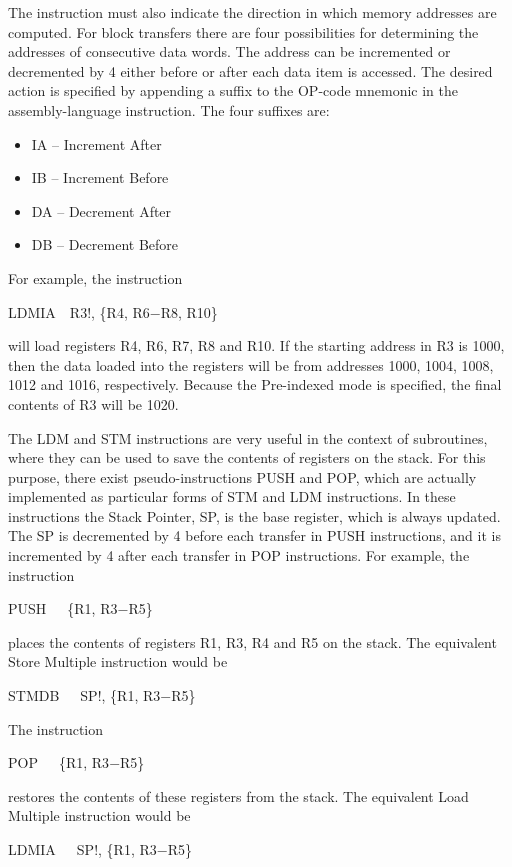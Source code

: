 \documentclass[11pt, twoside, pdftex]{article}
\begin{document}
The instruction must also indicate the direction in which
memory addresses are computed. For block transfers there are four
possibilities for determining the addresses of consecutive data
words. The address can be incremented or decremented by 4 either before or after each data item is accessed. The desired action
is specified by appending a suffix to the OP-code mnemonic in the 
assembly-language instruction. The four suffixes are:
\begin{itemize}
\item IA -- Increment After
\item IB -- Increment Before
\item DA -- Decrement After
\item DB -- Decrement Before
\end{itemize}
\noindent
For example, the instruction
\begin{center}
LDMIA~~R3!, \{R4, R6$-$R8, R10\}
\end{center}
will load registers R4, R6, R7, R8 and R10. If the starting
address in R3 is 1000, then the data loaded into the registers
will be from addresses 1000, 1004, 1008, 1012 and 1016,
respectively. Because the Pre-indexed mode is specified, the
final contents of R3 will be 1020.

The LDM and STM instructions are very useful in the context of
subroutines, where they can be used to save the contents of
registers on the stack. For this purpose, there exist 
pseudo-instructions PUSH and POP, which are actually implemented 
as particular forms of STM and LDM instructions.
In these instructions the Stack Pointer, SP, is the base
register, which is always updated. The SP is decremented by 4
before each transfer in PUSH instructions, and it is incremented
by 4 after each transfer in POP instructions.
For example, the instruction 
\begin{center}
PUSH~~~\{R1, R3$-$R5\}
\end{center}
\noindent
places the contents of registers R1, R3, R4 and R5 on the stack.
The equivalent Store Multiple instruction would be
\begin{center}
STMDB~~~SP!, \{R1, R3$-$R5\}
\end{center}
\noindent
The instruction
\begin{center}
POP~~~\{R1, R3$-$R5\}
\end{center}
\noindent
restores the contents of these registers from the stack.
The equivalent Load Multiple instruction would be
\begin{center}
LDMIA~~~SP!, \{R1, R3$-$R5\}
\end{center}
 
\end{document}
